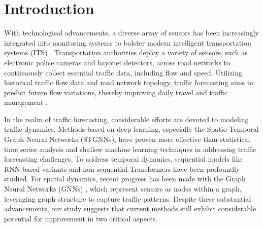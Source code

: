 \section{Introduction}
\label{sec.intro}

With technological advancements, a diverse array of sensors has been increasingly integrated into monitoring systems to bolster modern intelligent transportation systems (ITS) \cite{cirstea2021enhancenet,ji2022stden, dai2023dynamic}. Transportation authorities deploy a variety of sensors, such as electronic police cameras and bayonet detectors, across road networks to continuously collect essential traffic data, including flow and speed. Utilizing historical traffic flow data and road network topology, traffic forecasting aims to predict future flow variations, thereby improving daily travel and traffic management \cite{dai2021temporal,li2023dynamic}.

In the realm of traffic forecasting, considerable efforts are devoted to modeling traffic dynamics. Methods based on deep learning, especially the Spatio-Temporal Graph Neural Networks (STGNNs), have proven more effective than statistical time series analysis and shallow machine learning techniques in addressing traffic forecasting challenges. To address temporal dynamics, sequential models like RNN-based variants \cite{graves2012LSTM,deng2022multi,deng2024disentangling} and non-sequential Transformers \cite{vaswani2017Transformer} have been profoundly studied. For spatial dynamics, recent progress has been made with the Graph Neural Networks (GNNs) \cite{yin2021survey}, which represent sensors as nodes within a graph, leveraging graph structure to capture traffic patterns. Despite these substantial advancements, our study suggests that current methods still exhibit considerable potential for improvement in two critical aspects.


